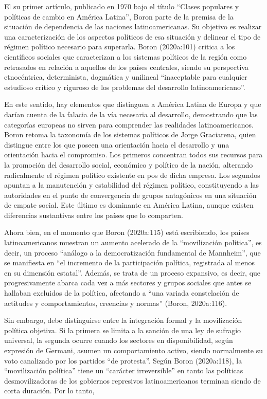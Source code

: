 El su primer artículo, publicado en 1970 bajo el título ``Clases populares y políticas de cambio en América Latina'', Boron parte de la premisa de la situación de dependencia de las naciones latinoamericanas. Su objetivo es realizar una caracterización de los aspectos políticos de esa situación y delinear el tipo de régimen político necesario para superarla. Boron (2020a:101) critica a los científicos sociales que caracterizan a los sistemas políticos de la región como retrasados en relación a aquellos de los países centrales, siendo su perspectiva etnocéntrica, determinista, dogmática y unilineal ``inaceptable para cualquier estudioso crítico y riguroso de los problemas del desarrollo latinoamericano''.

En este sentido, hay elementos que distinguen a América Latina de Europa y que darían cuenta de la falacia de la vía necesaria al desarrollo, demostrando que las categorías europeas no sirven para comprender las realidades latinoamericanos. Boron retoma la taxonomía de los sistemas políticos de Jorge Graciarena, quien distingue entre los que poseen una orientación hacia el desarrollo y una orientación hacia el compromiso. Los primeros concentran todos sus recursos para la promoción del desarrollo social, económico y político de la nación, alterando radicalmente el régimen político existente en pos de dicha empresa. Los segundos apuntan a la manutención y estabilidad del régimen político, constituyendo a las autoridades en el punto de convergencia de grupos antagónicos en una situación de empate social. Este último es dominante en América Latina, aunque existen diferencias sustantivas entre los países que lo comparten.

Ahora bien, en el momento que Boron (2020a:115) está escribiendo, los países latinoamericanos muestran un aumento acelerado de la ``movilización política'', es decir, un proceso ``análogo a la democratización fundamental de Mannheim'', que se manifiesta en ``el incremento de la participación política, registrada al menos en su dimensión estatal''. Además, se trata de un proceso expansivo, es decir, que progresivamente abarca cada vez a más sectores y grupos sociales que antes se hallaban excluidos de la política, afectando a ``una variada constelación de actitudes y comportamientos, creencias y normas'' (Boron, 2020a:116).

Sin embargo, debe distinguirse entre la integración formal y la movilización política objetiva. Si la primera se limita a la sanción de una ley de sufragio universal, la segunda ocurre cuando los sectores en disponibilidad, según expresión de Germani, asumen un comportamiento activo, siendo normalmente su voto canalizado por los partidos ``de protesta''. Según Boron (2020a:118), la ``movilización política'' tiene un ``carácter irreversible'' en tanto las políticas desmovilizadoras de los gobiernos represivos latinoamericanos terminan siendo de corta duración. Por lo tanto,

